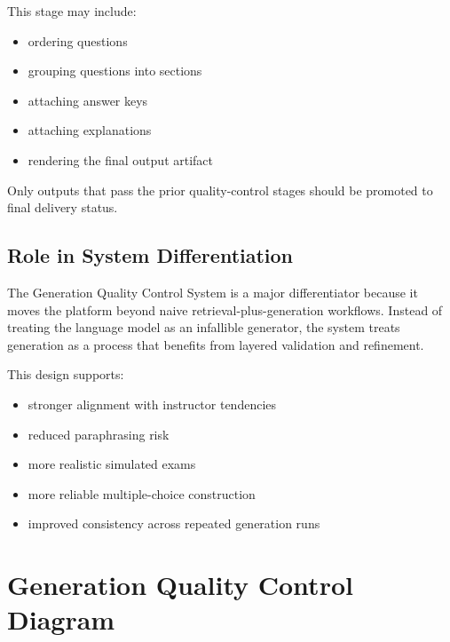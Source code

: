\documentclass[11pt]{article}
\begin{document}
This stage may include:
\begin{itemize}
\item ordering questions
\item grouping questions into sections
\item attaching answer keys
\item attaching explanations
\item rendering the final output artifact
\end{itemize}

Only outputs that pass the prior quality-control stages should be promoted to final delivery status.

\subsection{Role in System Differentiation}
The Generation Quality Control System is a major differentiator because it moves the platform beyond naive retrieval-plus-generation workflows. Instead of treating the language model as an infallible generator, the system treats generation as a process that benefits from layered validation and refinement.

This design supports:
\begin{itemize}
\item stronger alignment with instructor tendencies
\item reduced paraphrasing risk
\item more realistic simulated exams
\item more reliable multiple-choice construction
\item improved consistency across repeated generation runs
\end{itemize}

\section{Generation Quality Control Diagram}
\end{document}
